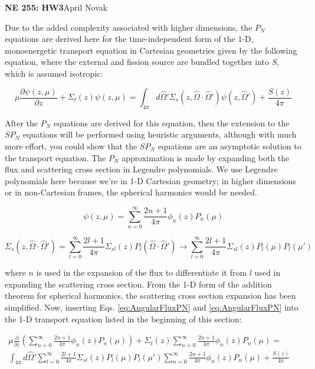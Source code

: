 \documentclass[10pt]{article}
\newcommand*\circled[1]{\tikz[baseline=(char.base)]{
            \node[shape=circle,draw,inner sep=2pt] (char) {#1};}}
\begin{document}
\textbf{NE 255: HW3}\hfill April Novak\newline

\circled{1} Due to the added complexity associated with higher dimensions, the \(P_N\) equations are derived here for the time-independent form of the 1-D, monoenergetic transport equation in Cartesian geometries given by the following equation, where the external and fission source are bundled together into \(S\), which is assumed isotropic:

\begin{equation*}
\mu \frac{\partial \psi(z, \mu)}{\partial z} +
 \Sigma_t(z)\psi(z, \mu) =\int_{4\pi}^{} d\hat{\Omega}' \Sigma_s(z, \hat{\Omega}\cdot\hat{\Omega}')\psi(z,\hat{\Omega}') + \frac{S(z)}{4\pi}
 \end{equation*}

After the \(P_N\) equations are derived for this equation, then the extension to the \(SP_N\) equations will be performed using heuristic arguments, although with much more effort, you could show that the \(SP_N\) equations are an asymptotic solution to the transport equation. The \(P_N\) approximation is made by expanding both the flux and scattering cross section in Legendre polynomials. We use Legendre polynomials here because we're in 1-D Cartesian geometry; in higher dimensions or in non-Cartesian frames, the spherical harmonics would be needed.

\begin{equation}
\label{eq:AngularFluxPN}
\psi(z,\mu)=\sum_{n=0}^{\infty}\frac{2n+1}{4\pi}\phi_n(z)P_n(\mu)
\end{equation}

\begin{equation}
\label{eq:PNScatteringCrossSectionExpansion}
\Sigma_s(z,\hat{\Omega}\cdot\hat{\Omega}')=\sum_{l=0}^{\infty}\frac{2l+1}{4\pi}\Sigma_{sl}(z)P_l(\hat{\Omega}\cdot\hat{\Omega}')\rightarrow\sum_{l=0}^{\infty}\frac{2l+1}{4\pi}\Sigma_{sl}(z)P_l(\mu)P_l(\mu')
\end{equation}

where \(n\) is used in the expansion of the flux to differentiate it from \(l\) used in expanding the scattering cross section. From the 1-D form of the addition theorem for spherical harmonics, the scattering cross section expansion has been simplified. Now, inserting Eqs. \eqref{eq:AngularFluxPN} and \eqref{eq:AngularFluxPN} into the 1-D transport equation listed in the beginning of this section:

\begin{equation}
\begin{aligned}
\mu \frac{\partial}{\partial z}\left(\sum_{n=0}^{\infty}\frac{2n+1}{4\pi}\phi_n(z)P_n(\mu)\right) + \Sigma_t(z)\sum_{n=0}^{\infty}\frac{2n+1}{4\pi}\phi_n(z)P_n(\mu) =\quad\quad\\
\int_{4\pi}^{} d\hat{\Omega}' \sum_{l=0}^{\infty}\frac{2l+1}{4\pi}\Sigma_{sl}(z)P_l(\mu)P_l(\mu')\sum_{n=0}^{\infty}\frac{2n+1}{4\pi}\phi_n(z)P_n(\mu) + \frac{S(z)}{4\pi}
 \end{aligned}
 \end{equation}
\end{document}
